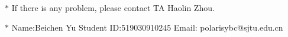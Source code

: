 \documentclass[12pt,a4paper]{article}
\theoremstyle{definition}
\begin{document}
	\noindent
	
	\noindent{}
	\begin{center}
		\footnotesize{\color{red}$*$ If there is any problem, please contact TA Haolin Zhou.}
		
		\footnotesize{\color{blue}$*$ Name:Beichen Yu  \quad Student ID:519030910245 \quad Email: polarisybc@sjtu.edu.cn}
		
	\end{center}
	
\end{document}
